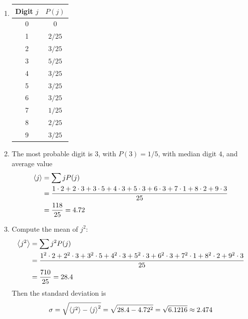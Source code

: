 \documentclass[a4paper]{article}
\begin{document}
\begin{enumerate}[label=(\alph*)]
	\item \begin{table}[h]
	\centering
	\begin{tabular}{c c}
		\hline
		Digit \( j \) & \( P \!\left( j \right) \) \\
		\hline
		0 & \( 0 \) \\
		1 & \( 2/25 \) \\
		2 & \( 3/25 \) \\
		3 & \( 5/25 \) \\
		4 & \( 3/25 \) \\
		5 & \( 3/25 \) \\
		6 & \( 3/25 \) \\
		7 & \( 1/25 \) \\
		8 & \( 2/25 \) \\
		9 & \( 3/25 \) \\
		\hline
	\end{tabular}
	\end{table}
	\item The most probable digit is \( 3 \), with \( P \!\left( 3 \right) = 1/5 \), with median digit \( 4 \), and average value
	\begin{align*}
		\braket{j} & = \sum j P \!\left( j \right) \\
			   & = \frac{1 \cdot 2 + 2 \cdot 3 + 3 \cdot 5 + 4 \cdot 3 + 5 \cdot 3 + 6 \cdot 3 + 7 \cdot 1 + 8 \cdot 2 + 9 \cdot 3}{25} \\
			   & = \frac{118}{25} = 4.72
	\end{align*}
	\item Compute the mean of \( j^{2} \):
	\begin{align*}
		\braket{j^{2}} & = \sum j^{2}P \!\left( j \right) \\
			   & = \frac{1^{2} \cdot 2 + 2^{2} \cdot 3 + 3^{2} \cdot 5 + 4^{2} \cdot 3 + 5^{2} \cdot 3 + 6^{2} \cdot 3 + 7^{2} \cdot 1 + 8^{2} \cdot 2 + 9^{2} \cdot 3}{25} \\
			   & = \frac{710}{25} = 28.4
	\end{align*}
	Then the standard deviation is
	\[
		\sigma = \sqrt{\braket{j^{2}} - \braket{j}^{2}} = \sqrt{28.4 - 4.72^{2}} = \sqrt{6.1216} \approx 2.474
	\]
\end{enumerate}
\end{document}
